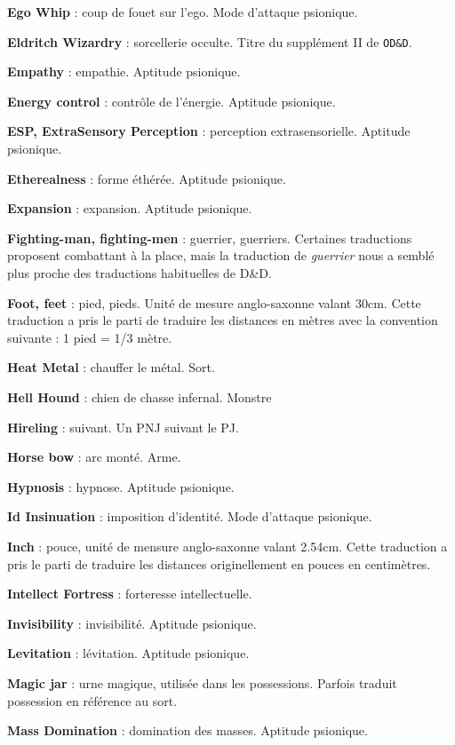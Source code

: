 \documentclass[11pt]{article}
\begin{document}
{\textbf{Ego Whip} : coup de fouet sur l'ego. Mode d'attaque psionique.

\textbf{Eldritch Wizardry} : sorcellerie occulte. Titre du supplément II de \texttt{OD\&D}.

\textbf{Empathy} : empathie. Aptitude psionique.

\textbf{Energy control} : contrôle de l'énergie. Aptitude psionique.

\textbf{ESP, ExtraSensory Perception} : perception extrasensorielle. Aptitude psionique.

\textbf{Etherealness} : forme éthérée. Aptitude psionique.

\textbf{Expansion} : expansion. Aptitude psionique.

\textbf{Fighting-man, fighting-men} : guerrier, guerriers. Certaines traductions proposent \og combattant \fg{} à la place, mais la traduction de \textit{guerrier} nous a semblé plus proche des traductions habituelles de D\&D.

\textbf{Foot, feet} : pied, pieds. Unité de mesure anglo-saxonne valant 30cm. Cette traduction a pris le parti de traduire les distances en mètres avec la convention suivante : 1 pied = 1/3 mètre.

\textbf{Heat Metal} : chauffer le métal. Sort.

\textbf{Hell Hound} : chien de chasse infernal. Monstre

\textbf{Hireling} : suivant. Un PNJ suivant le PJ.

\textbf{Horse bow} : arc monté. Arme.

\textbf{Hypnosis} : hypnose. Aptitude psionique.

\textbf{Id Insinuation} : imposition d'identité. Mode d'attaque psionique.

\textbf{Inch} : pouce, unité de mensure anglo-saxonne valant 2.54cm. Cette traduction a pris le parti de traduire les distances originellement en pouces en centimètres.

\textbf{Intellect Fortress} : forteresse intellectuelle.

\textbf{Invisibility} : invisibilité. Aptitude psionique.

\textbf{Levitation} : lévitation. Aptitude psionique.

\textbf{Magic jar} : urne magique, utilisée dans les possessions. Parfois traduit possession en référence au sort.

\textbf{Mass Domination} : domination des masses. Aptitude psionique.

}
\end{document}
